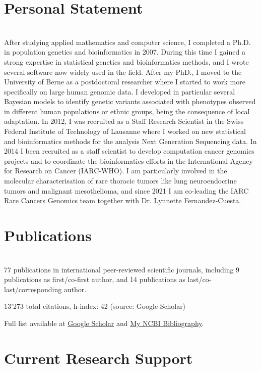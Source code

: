 \documentclass[10pt,a4paper]{article}
\begin{document}
\section{Personal Statement}
\ \\
After studying applied mathematics and computer science, I completed a Ph.D. in population genetics and
bioinformatics in 2007. During this time I gained a strong expertise in statistical genetics and bioinformatics methods,
and I wrote several software now widely used in the field. After my PhD., I moved to the University of Berne
 as a postdoctoral researcher where I
started to work more specifically on large human genomic data. I developed in particular several Bayesian
models to identify genetic variants associated with phenotypes observed in different human populations or ethnic groups, being the consequence of local adaptation. In 2012, I was recruited as a Staff Research Scientist in the Swiss Federal Institute of Technology of Lausanne where I worked on new statistical and bioinformatics
methods for the analysis Next Generation Sequencing data. In 2014 I been recruited as a staff
scientist to develop computation cancer genomics projects and to coordinate the
bioinformatics efforts in the International Agency for Research on Cancer (IARC-WHO). I am particularly
involved in the molecular characterisation of rare thoracic tumors like lung neuroendocrine tumors and
malignant mesothelioma, and since 2021 I am co-leading the IARC Rare Cancers Genomics team together
with Dr. Lynnette Fernandez-Cuesta.

\section{Publications}
\ \\
77 publications in international peer-reviewed scientific journals, including 9 publications as first/co-first author, and 14 publications as last/co-last/corresponding author.

13'273 total citations, h-index: 42 (source: Google Scholar)

Full list available at \href{https://scholar.google.com/citations?hl=en&user=vzZPQj8AAAAJ&view_op=list_works&sortby=pubdate}{Google Scholar} and  \href{https://www.ncbi.nlm.nih.gov/myncbi/matthieu.foll.1/bibliography/public/}{My NCBI Bibliography}.


\section{Current Research Support}
\end{document}
